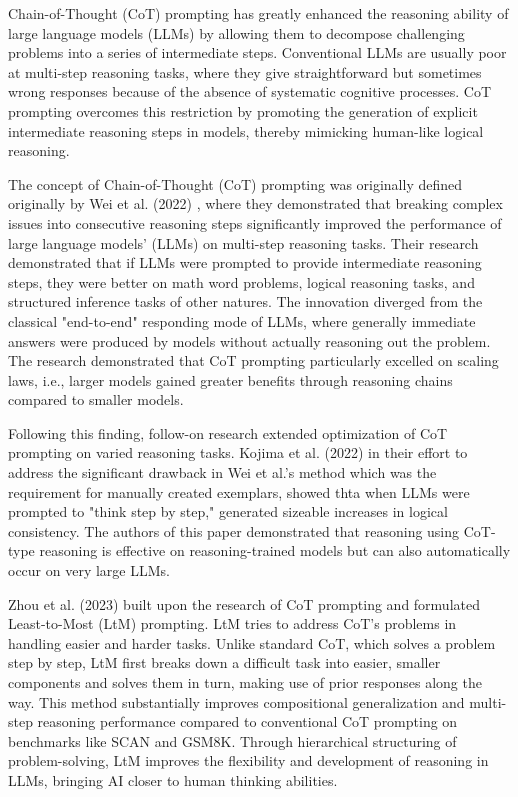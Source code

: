 Chain-of-Thought (CoT) prompting has greatly enhanced the reasoning ability of large language models (LLMs) by allowing them to decompose challenging problems into a series of intermediate steps. Conventional LLMs are usually poor at multi-step reasoning tasks, where they give straightforward but sometimes wrong responses because of the absence of systematic cognitive processes. CoT prompting overcomes this restriction by promoting the generation of explicit intermediate reasoning steps in models, thereby mimicking human-like logical reasoning.
\par
The concept of Chain-of-Thought (CoT) prompting was originally  defined originally by Wei et al. (2022) \cite{wei2022chain}, where they demonstrated that breaking complex issues into consecutive reasoning steps significantly improved the performance of large language models' (LLMs) on multi-step reasoning tasks. Their research demonstrated that if LLMs were prompted to provide intermediate reasoning steps, they were better on math word problems, logical reasoning tasks, and structured inference tasks of other natures. The innovation diverged from the classical "end-to-end" responding mode of LLMs, where generally immediate answers were produced by models without actually reasoning out the problem. The research demonstrated that CoT prompting particularly excelled on scaling laws, i.e., larger models gained greater benefits through reasoning chains compared to smaller models.
\par
Following this finding, follow-on research extended optimization of CoT prompting on varied reasoning tasks. Kojima et al. (2022) \cite{kojima2022large} in their effort to address the significant drawback in Wei et al.'s method which was the requirement for manually created exemplars, showed thta when LLMs were prompted to "think step by step," generated sizeable increases in logical consistency. The authors of this paper demonstrated that reasoning using CoT-type reasoning is effective on reasoning-trained models but can also automatically occur on very large LLMs.
\par
Zhou et al. (2023) \cite{zhou2023leasttomostpromptingenablescomplex} built upon the research of CoT prompting and formulated Least-to-Most (LtM) prompting. LtM tries to address CoT's problems in handling easier and harder tasks. Unlike standard CoT, which solves a problem step by step, LtM first breaks down a difficult task into easier, smaller components and solves them in turn, making use of prior responses along the way. This method substantially improves compositional generalization and multi-step reasoning performance compared to conventional CoT prompting on benchmarks like SCAN and GSM8K. Through hierarchical structuring of problem-solving, LtM improves the flexibility and development of reasoning in LLMs, bringing AI closer to human thinking abilities.
